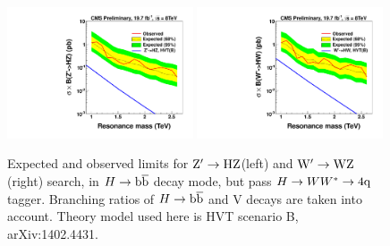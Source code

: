 \begin{figure}[ht!pb]
\begin{center}
\includegraphics[width=0.49\textwidth]{EXO-14-009/brazilianFlag_HbbZqqHwwHPLPHV.pdf}
\includegraphics[width=0.49\textwidth]{EXO-14-009/brazilianFlag_HbbWqqHwwHPLPHV.pdf}
\end{center}
\caption{Expected and observed limits for ${\rm Z'\to HZ}$(left) and ${\rm W' \to WZ}$(right)
 search, in $H \to \mathrm{b\overline{b}}$ decay mode, but pass $H \to WW^*\to4{\rm q}$ tagger. Branching ratios of $H \to \mathrm{b\overline{b}}$ and V decays are
 taken into account. Theory model used here is HVT scenario B, arXiv:1402.4431.
}
\label{fig:HbbVHwwCombined}
\end{figure}




\clearpage
